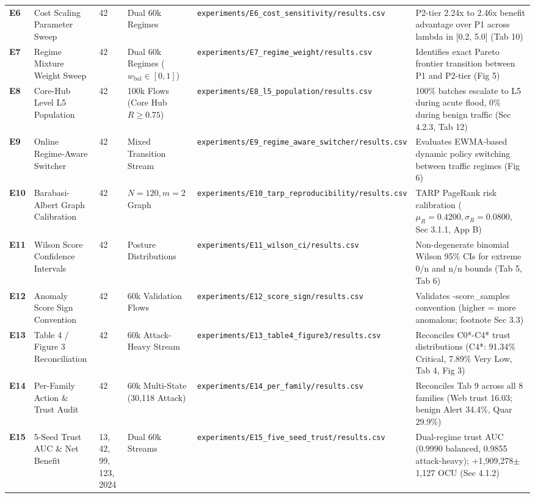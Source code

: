 \begin{table}[t]
\begin{tabular}{lp{2.8cm}p{1.8cm}p{2.6cm}p{3.8cm}p{4.2cm}}
\textbf{E6} & Cost Scaling Parameter Sweep & 42 & Dual 60k Regimes & \texttt{experiments/E6\_cost\_sensitivity/results.csv} & P2-tier 2.24x to 2.46x benefit advantage over P1 across lambda in [0.2, 5.0] (Tab 10) \\
\textbf{E7} & Regime Mixture Weight Sweep & 42 & Dual 60k Regimes ($w_{\text{bal}} \in [0, 1]$) & \texttt{experiments/E7\_regime\_weight/results.csv} & Identifies exact Pareto frontier transition between P1 and P2-tier (Fig 5) \\
\textbf{E8} & Core-Hub Level L5 Population & 42 & 100k Flows (Core Hub $R \ge 0.75$) & \texttt{experiments/E8\_l5\_population/results.csv} & 100\% batches escalate to L5 during acute flood, 0\% during benign traffic (Sec 4.2.3, Tab 12) \\
\textbf{E9} & Online Regime-Aware Switcher & 42 & Mixed Transition Stream & \texttt{experiments/E9\_regime\_aware\_switcher/results.csv} & Evaluates EWMA-based dynamic policy switching between traffic regimes (Fig 6) \\
\textbf{E10} & Barabasi-Albert Graph Calibration & 42 & $N=120, m=2$ Graph & \texttt{experiments/E10\_tarp\_reproducibility/results.csv} & TARP PageRank risk calibration ($\mu_R=0.4200, \sigma_R=0.0800$, Sec 3.1.1, App B) \\
\textbf{E11} & Wilson Score Confidence Intervals & 42 & Posture Distributions & \texttt{experiments/E11\_wilson\_ci/results.csv} & Non-degenerate binomial Wilson 95\% CIs for extreme 0/n and n/n bounds (Tab 5, Tab 6) \\
\textbf{E12} & Anomaly Score Sign Convention & 42 & 60k Validation Flows & \texttt{experiments/E12\_score\_sign/results.csv} & Validates -score\_samples convention (higher = more anomalous; footnote Sec 3.3) \\
\textbf{E13} & Table 4 / Figure 3 Reconciliation & 42 & 60k Attack-Heavy Stream & \texttt{experiments/E13\_table4\_figure3/results.csv} & Reconciles C0*-C4* trust distributions (C4*: 91.34\% Critical, 7.89\% Very Low, Tab 4, Fig 3) \\
\textbf{E14} & Per-Family Action \& Trust Audit & 42 & 60k Multi-State (30,118 Attack) & \texttt{experiments/E14\_per\_family/results.csv} & Reconciles Tab 9 across all 8 families (Web trust 16.03; benign Alert 34.4\%, Quar 29.9\%) \\
\textbf{E15} & 5-Seed Trust AUC \& Net Benefit & 13, 42, 99, 123, 2024 & Dual 60k Streams & \texttt{experiments/E15\_five\_seed\_trust/results.csv} & Dual-regime trust AUC (0.9990 balanced, 0.9855 attack-heavy); +1,909,278$\pm$1,127 OCU (Sec 4.1.2) \\

\end{tabular}
\end{table}
